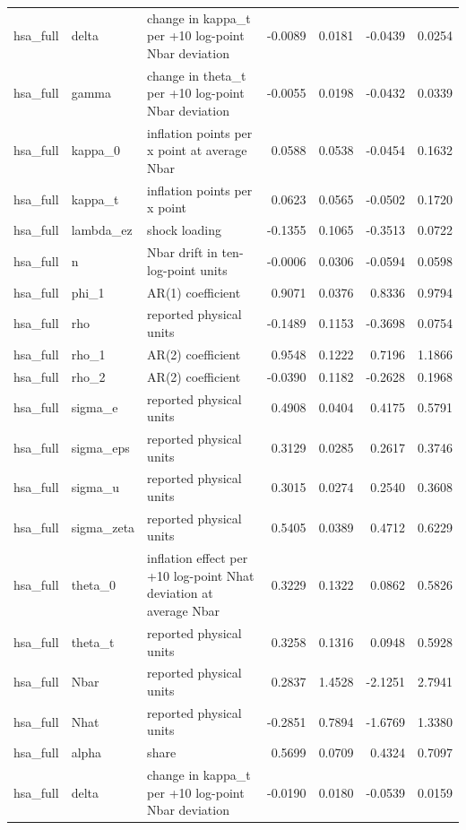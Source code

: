 \begin{tabular}{lllrrrr}
hsa\_full & delta & change in kappa\_t per +10 log-point Nbar deviation & -0.0089 & 0.0181 & -0.0439 & 0.0254 \\
hsa\_full & gamma & change in theta\_t per +10 log-point Nbar deviation & -0.0055 & 0.0198 & -0.0432 & 0.0339 \\
hsa\_full & kappa\_0 & inflation points per x point at average Nbar & 0.0588 & 0.0538 & -0.0454 & 0.1632 \\
hsa\_full & kappa\_t & inflation points per x point & 0.0623 & 0.0565 & -0.0502 & 0.1720 \\
hsa\_full & lambda\_ez & shock loading & -0.1355 & 0.1065 & -0.3513 & 0.0722 \\
hsa\_full & n & Nbar drift in ten-log-point units & -0.0006 & 0.0306 & -0.0594 & 0.0598 \\
hsa\_full & phi\_1 & AR(1) coefficient & 0.9071 & 0.0376 & 0.8336 & 0.9794 \\
hsa\_full & rho & reported physical units & -0.1489 & 0.1153 & -0.3698 & 0.0754 \\
hsa\_full & rho\_1 & AR(2) coefficient & 0.9548 & 0.1222 & 0.7196 & 1.1866 \\
hsa\_full & rho\_2 & AR(2) coefficient & -0.0390 & 0.1182 & -0.2628 & 0.1968 \\
hsa\_full & sigma\_e & reported physical units & 0.4908 & 0.0404 & 0.4175 & 0.5791 \\
hsa\_full & sigma\_eps & reported physical units & 0.3129 & 0.0285 & 0.2617 & 0.3746 \\
hsa\_full & sigma\_u & reported physical units & 0.3015 & 0.0274 & 0.2540 & 0.3608 \\
hsa\_full & sigma\_zeta & reported physical units & 0.5405 & 0.0389 & 0.4712 & 0.6229 \\
hsa\_full & theta\_0 & inflation effect per +10 log-point Nhat deviation at average Nbar & 0.3229 & 0.1322 & 0.0862 & 0.5826 \\
hsa\_full & theta\_t & reported physical units & 0.3258 & 0.1316 & 0.0948 & 0.5928 \\
hsa\_full & Nbar & reported physical units & 0.2837 & 1.4528 & -2.1251 & 2.7941 \\
hsa\_full & Nhat & reported physical units & -0.2851 & 0.7894 & -1.6769 & 1.3380 \\
hsa\_full & alpha & share & 0.5699 & 0.0709 & 0.4324 & 0.7097 \\
hsa\_full & delta & change in kappa\_t per +10 log-point Nbar deviation & -0.0190 & 0.0180 & -0.0539 & 0.0159 \\

\end{tabular}
